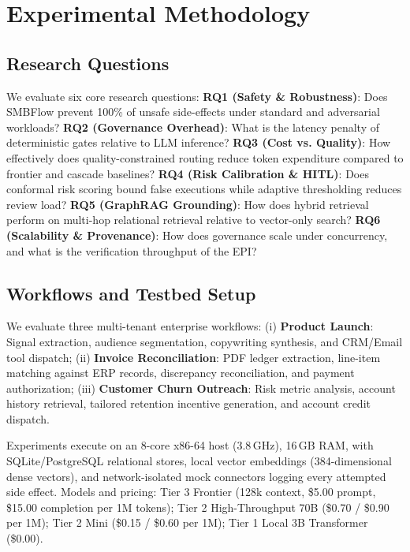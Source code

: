 \documentclass[conference]{IEEEtran}
\begin{document}
\section{Experimental Methodology}

\subsection{Research Questions}
We evaluate six core research questions:
\textbf{RQ1 (Safety \& Robustness)}: Does SMBFlow prevent 100\% of unsafe side-effects under standard and adversarial workloads?
\textbf{RQ2 (Governance Overhead)}: What is the latency penalty of deterministic gates relative to LLM inference?
\textbf{RQ3 (Cost vs. Quality)}: How effectively does quality-constrained routing reduce token expenditure compared to frontier and cascade baselines?
\textbf{RQ4 (Risk Calibration \& HITL)}: Does conformal risk scoring bound false executions while adaptive thresholding reduces review load?
\textbf{RQ5 (GraphRAG Grounding)}: How does hybrid retrieval perform on multi-hop relational retrieval relative to vector-only search?
\textbf{RQ6 (Scalability \& Provenance)}: How does governance scale under concurrency, and what is the verification throughput of the EPI?

\subsection{Workflows and Testbed Setup}
We evaluate three multi-tenant enterprise workflows: (i) \textbf{Product Launch}: Signal extraction, audience segmentation, copywriting synthesis, and CRM/Email tool dispatch; (ii) \textbf{Invoice Reconciliation}: PDF ledger extraction, line-item matching against ERP records, discrepancy reconciliation, and payment authorization; (iii) \textbf{Customer Churn Outreach}: Risk metric analysis, account history retrieval, tailored retention incentive generation, and account credit dispatch.

Experiments execute on an 8-core x86-64 host (3.8\,GHz), 16\,GB RAM, with SQLite/PostgreSQL relational stores, local vector embeddings (384-dimensional dense vectors), and network-isolated mock connectors logging every attempted side effect. Models and pricing: Tier 3 Frontier (128k context, \$5.00 prompt, \$15.00 completion per 1M tokens); Tier 2 High-Throughput 70B (\$0.70 / \$0.90 per 1M); Tier 2 Mini (\$0.15 / \$0.60 per 1M); Tier 1 Local 3B Transformer (\$0.00).
\end{document}

